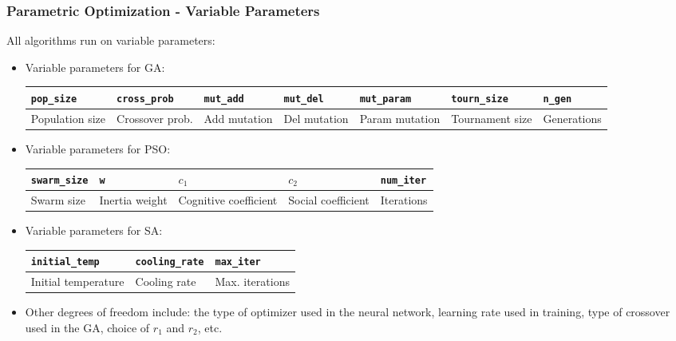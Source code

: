 \documentclass{beamer}
\begin{document}
    \begin{frame}
        \frametitle{Parametric Optimization - Variable Parameters}
        All algorithms run on variable parameters: 
        \begin{itemize}
            \item Variable parameters for GA:
            \begin{table}[h]
                \tiny
                \begin{tabular}{@{}p{1.4cm}p{1.2cm}p{1.0cm}p{1.0cm}p{1.0cm}p{1.2cm}p{1.0cm}@{}}
                \toprule
                \texttt{pop\_size} & \texttt{cross\_prob} & \texttt{mut\_add} & \texttt{mut\_del} & \texttt{mut\_param} & \texttt{tourn\_size} & \texttt{n\_gen} \\
                \midrule
                Population size & Crossover prob. & Add mutation & Del mutation & Param mutation & Tournament size & Generations  \\
                \bottomrule
                \end{tabular}
                \label{tab:ga_param}
            \end{table}
            \item Variable parameters for PSO:
            \begin{table}[]
                \tiny
                \begin{tabular}{@{}p{1.7cm}p{1.4cm}p{1.4cm}p{1.4cm}p{1.7cm}@{}}
                \toprule
                \texttt{swarm\_size} & \texttt{w} & $c_1$ & $c_2$ & \texttt{num\_iter} \\ \midrule
                Swarm size & Inertia weight & Cognitive coefficient & Social coefficient & Iterations \\ \bottomrule
                \end{tabular}
                \label{tab:pso_param}
            \end{table}
            \item Variable parameters for SA:
            \begin{table}[]
                \tiny
                \begin{tabular}{@{}p{1.8cm}p{1.5cm}p{1.5cm}@{}}
                \toprule
                \texttt{initial\_temp} & \texttt{cooling\_rate} & \texttt{max\_iter} \\ \midrule
                Initial temperature & Cooling rate & Max. iterations \\ \bottomrule
                \end{tabular}
                \label{tab:sa_param}
            \end{table}
            \item Other degrees of freedom include: the type of optimizer used in the neural network, learning rate used in training, type of crossover used in the GA, choice of $r_1$ and $r_2$, etc.
        \end{itemize}
    \end{frame}
\end{document}
